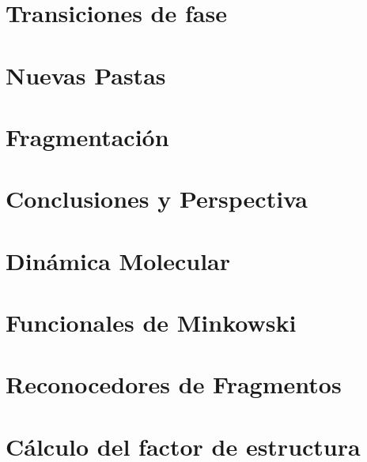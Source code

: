 \documentclass[12pt]{book}
\begin{document}
\chapter[Transiciones de fase]{Transiciones de fase}
\label{ch:transicion}


\chapter[Nuevas pastas]{Nuevas Pastas}
\label{ch:nuevas_pastas}


\chapter[Fragmentación]{Fragmentación}
\label{ch:fragmentacion}


\chapter[Conclusiones y Perspectiva]{Conclusiones y Perspectiva}
\label{ch:conclusiones}


\appendix

\chapter{Dinámica Molecular}
\label{ap:md}


\chapter{Funcionales de Minkowski}
\label{ap:minkowski}


\chapter{Reconocedores de Fragmentos}
\label{ap:reconocedores}


\chapter{Cálculo del factor de estructura}
\label{ap:sq}



\end{document}
